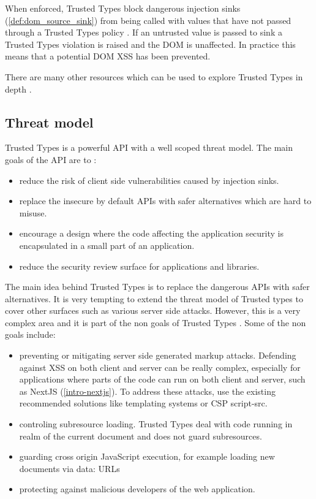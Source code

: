 When enforced, Trusted Types block dangerous injection sinks (\ref{def:dom_source_sink}) from being
called with values that have not passed through a Trusted Types policy \cite{tt_background}. If an
untrusted value is passed to sink a Trusted Types violation is raised and the DOM is unaffected. In
practice this means that a potential DOM XSS has been prevented.

There are many other resources which can be used to explore Trusted Types in depth
\cite{tt_resources}.

\subsection{Threat model}

Trusted Types is a powerful API with a well scoped threat model. The main goals of the API are to
\cite{tt_spec:goals}:

\begin{itemize}
  \item reduce the risk of client side vulnerabilities caused by injection sinks.
  \item replace the insecure by default APIs with safer alternatives which are hard to misuse.
  \item encourage a design where the code affecting the application security is encapsulated in a
        small part of an application.
  \item reduce the security review surface for applications and libraries.
\end{itemize}

The main idea behind Trusted Types is to replace the dangerous APIs with safer alternatives. It is
very tempting to extend the threat model of Trusted types to cover other surfaces such as various
server side attacks. However, this is a very complex area and it is part of the non goals of Trusted
Types \cite{tt_spec:non_goals}. Some of the non goals include:

\begin{itemize}
  \item preventing or mitigating server side generated markup attacks. Defending against XSS on both
        client and server can be really complex, especially for applications where parts of the code
        can run on both client and server, such as NextJS (\ref{intro-nextjs}). To address these
        attacks, use the existing recommended solutions like templating systems or CSP script-src.
  \item controling subresource loading. Trusted Types deal with code running in realm of the current
        document and does not guard subresources.
  \item guarding cross origin JavaScript execution, for example loading new documents via data: URLs
  \item protecting against malicious developers of the web application.
\end{itemize}

